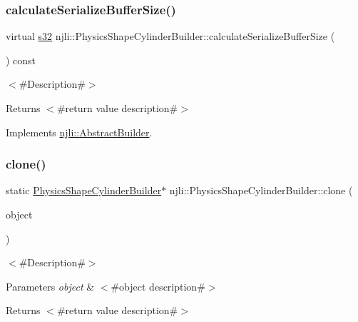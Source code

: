 \subsubsection{\texorpdfstring{calculate\+Serialize\+Buffer\+Size()}{calculateSerializeBufferSize()}}
{\footnotesize\ttfamily virtual \mbox{\hyperlink{_util_8h_aa62c75d314a0d1f37f79c4b73b2292e2}{s32}} njli\+::\+Physics\+Shape\+Cylinder\+Builder\+::calculate\+Serialize\+Buffer\+Size (\begin{DoxyParamCaption}{ }\end{DoxyParamCaption}) const\hspace{0.3cm}{\ttfamily [virtual]}}

$<$\#\+Description\#$>$

\begin{DoxyReturn}{Returns}
$<$\#return value description\#$>$ 
\end{DoxyReturn}


Implements \mbox{\hyperlink{classnjli_1_1_abstract_builder_aa1d220053e182c37b31b427499c6eacf}{njli\+::\+Abstract\+Builder}}.

\mbox{\label{classnjli_1_1_physics_shape_cylinder_builder_a4294a014b8dfb62b8c613caa4624b565}} 
\subsubsection{\texorpdfstring{clone()}{clone()}}
{\footnotesize\ttfamily static \mbox{\hyperlink{classnjli_1_1_physics_shape_cylinder_builder}{Physics\+Shape\+Cylinder\+Builder}}$\ast$ njli\+::\+Physics\+Shape\+Cylinder\+Builder\+::clone (\begin{DoxyParamCaption}\item[{const \mbox{\hyperlink{classnjli_1_1_physics_shape_cylinder_builder}{Physics\+Shape\+Cylinder\+Builder}} \&}]{object }\end{DoxyParamCaption})\hspace{0.3cm}{\ttfamily [static]}}

$<$\#\+Description\#$>$


\begin{DoxyParams}{Parameters}
{\em object} & $<$\#object description\#$>$\\
\hline
\end{DoxyParams}
\begin{DoxyReturn}{Returns}
$<$\#return value description\#$>$ 
\end{DoxyReturn}
\mbox{\label{classnjli_1_1_physics_shape_cylinder_builder_aefd37a42f1a5cd301ad2db9194cbfa9e}} 
